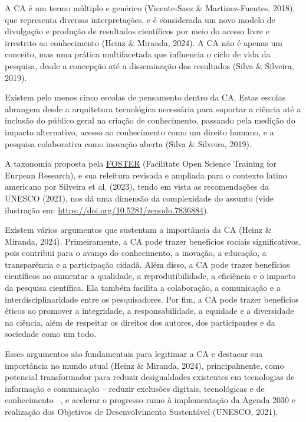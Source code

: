 \documentclass[
  a4paper,
]{book}
\begin{document}
A CA é um termo múltiplo e genérico (Vicente-Saez \& Martinez-Fuentes,
2018), que representa diversas interpretações, e é considerada um novo
modelo de divulgação e produção de resultados científicos por meio do
acesso livre e irrestrito ao conhecimento (Heinz \& Miranda, 2024). A CA
não é apenas um conceito, mas uma prática multifacetada que influencia o
ciclo de vida da pesquisa, desde a concepção até a disseminação dos
resultados (Silva \& Silveira, 2019).

Existem pelo menos cinco escolas de pensamento dentro da CA. Estas
escolas abrangem desde a arquitetura tecnológica necessária para
suportar a ciência até a inclusão do público geral na criação de
conhecimento, passando pela medição do impacto alternativo, acesso ao
conhecimento como um direito humano, e a pesquisa colaborativa como
inovação aberta (Silva \& Silveira, 2019).

A taxonomia proposta pela
\href{https://www.fosteropenscience.eu/foster-taxonomy/open-workflow-tools}{FOSTER}
(Facilitate Open Science Training for Eurpean Research), e sua releitura
revisada e ampliada para o contexto latino americano por Silveira et al.
(2023), tendo em vista as recomendações da UNESCO (2021), nos dá uma
dimensão da complexidade do assunto (vide ilustração em:
\url{https://doi.org/10.5281/zenodo.7836884}).

Existem vários argumentos que sustentam a importância da CA (Heinz \&
Miranda, 2024). Primeiramente, a CA pode trazer benefícios sociais
significativos, pois contribui para o avanço do conhecimento, a
inovação, a educação, a transparência e a participação cidadã. Além
disso, a CA pode trazer benefícios científicos ao aumentar a qualidade,
a reprodutibilidade, a eficiência e o impacto da pesquisa científica.
Ela também facilita a colaboração, a comunicação e a
interdisciplinaridade entre os pesquisadores. Por fim, a CA pode trazer
benefícios éticos ao promover a integridade, a responsabilidade, a
equidade e a diversidade na ciência, além de respeitar os direitos dos
autores, dos participantes e da sociedade como um todo.

Esses argumentos são fundamentais para legitimar a CA e destacar sua
importância no mundo atual (Heinz \& Miranda, 2024), principalmente,
como potencial transformador para reduzir desigualdades existentes em
tecnologias de informação e comunicação -- reduzir exclusões digitais,
tecnológicas e de conhecimento --, e acelerar o progresso rumo à
implementação da Agenda 2030 e realização dos Objetivos de
Desenvolvimento Sustentável (UNESCO, 2021).
\end{document}
